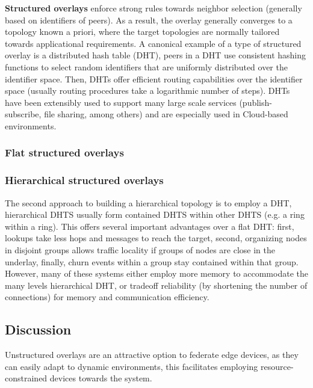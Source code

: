 \textbf{Structured overlays} enforce strong rules towards neighbor selection (generally based on identifiers of peers). As a result, the overlay generally converges to a topology known a priori, where the target topologies are normally tailored towards applicational requirements. A canonical example of a type of structured overlay is a distributed hash table (DHT), peers in a DHT use consistent hashing functions to select random identifiers that are uniformly distributed over the identifier space. Then, DHTs offer efficient routing capabilities over the identifier space (usually routing procedures take a logarithmic number of steps). DHTs have been extensibly used to support many large scale services (publish-subscribe, file sharing, among others) and are especially used in Cloud-based environments. 

\subsubsection{Flat structured overlays}



\subsubsection{Hierarchical structured overlays}


 The second approach to building a hierarchical topology is to employ a DHT, hierarchical DHTS usually form contained DHTS within other DHTS (e.g. a ring within a ring). This offers several important advantages over a flat DHT: first, lookups take less hops and messages to reach the target, second, organizing nodes in disjoint groups allows traffic locality if groups of nodes are close in the underlay, finally, churn events within a group stay contained within that group. However, many of these systems either employ more memory to accommodate the many levels hierarchical DHT, or tradeoff reliability (by shortening the number of connections) for memory and communication efficiency.


\subsection{Discussion}

Unstructured overlays are an attractive option to federate edge devices, as they can easily adapt to dynamic environments, this facilitates employing resource-constrained devices towards the system.
